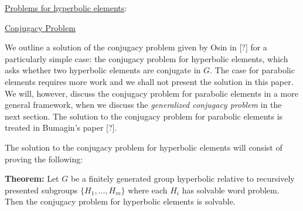 \documentclass[12pt]{article}
\newcommand{\vs}{\vskip10pt}
\begin{document}
	\vs 
	
	\underline{Problems for hyperbolic elements}: 
	
	\vs 
	
	\underline{Conjugacy Problem}
	
	\vs 
	
	We outline a solution of the conjugacy problem given by Osin in [?] for a particularly simple case: the conjugacy problem for hyperbolic elements, which asks whether two hyperbolic elements are conjugate in $G$. The case for parabolic elements requires more work and we shall not present the solution in this paper. We will, however, discuss the conjugacy problem for parabolic elements in a more general framework, when we discuss the \textit{generalized conjugacy problem} in the next section. The solution to the conjugacy problem for parabolic elements is treated in Bumagin's paper [?]. 
	
	\vs 
	
	The solution to the conjugacy problem for hyperbolic elements will consist of proving the following: 
	
	\vs 
	
	\textbf{Theorem: } Let $G$ be a finitely generated group hyperbolic relative to recursively presented subgroups $\{H_1,...,H_m\}$ where each $H_i$ has solvable word problem. Then the conjugacy problem for hyperbolic elements is solvable. 
	
\end{document}
